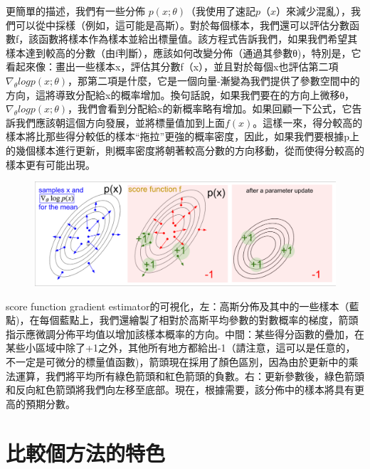 \documentclass[14pt,a4paper]{report}  %
\begin{document}
更簡單的描述，我們有一些分佈 $p(x;\theta)$（我使用了速記$ p（x）$來減少混亂），我們可以從中採樣（例如，這可能是高斯）。對於每個樣本，我們還可以評估分數函數f，該函數將樣本作為樣本並給出標量值。該方程式告訴我們，如果我們希望其樣本達到較高的分數（由f判斷），應該如何改變分佈（通過其參數θ)，特別是，它看起來像：畫出一些樣本x，評估其分數f（x），並且對於每個x也評估第二項 $\nabla_\theta logp(x;θ)$，那第二項是什麼，它是一個向量-漸變為我們提供了參數空間中的方向，這將導致分配給x的概率增加。換句話說，如果我們要在的方向上微移θ，$\nabla_\theta logp(x;θ)$，我們會看到分配給x的新概率略有增加。如果回顧一下公式，它告訴我們應該朝這個方向發展，並將標量值加到上面$f(x)$。這樣一來，得分較高的樣本將比那些得分較低的樣本“拖拉”更強的概率密度，因此，如果我們要根據p上的幾個樣本進行更新，則概率密度將朝著較高分數的方向移動，從而使得分較高的樣本更有可能出現。\\
\begin{figure}[hbt!]
\begin{center}
\includegraphics[scale=0.4]{figure}
\end{center}
\end{figure}
\qquad score function gradient estimator的可視化，左：高斯分佈及其中的一些樣本（藍點)，在每個藍點上，我們還繪製了相對於高斯平均參數的對數概率的梯度，箭頭指示應微調分佈平均值以增加該樣本概率的方向。中間：某些得分函數的疊加，在某些小區域中除了+1之外，其他所有地方都給出-1（請注意，這可以是任意的，不一定是可微分的標量值函數)，箭頭現在採用了顏色區別，因為由於更新中的乘法運算，我們將平均所有綠色箭頭和紅色箭頭的負數。右：更新參數後，綠色箭頭和反向紅色箭頭將我們向左移至底部。現在，根據需要，該分佈中的樣本將具有更高的預期分數。\\
\newpage
\section{比較個方法的特色}
\newpage
\end{document}
